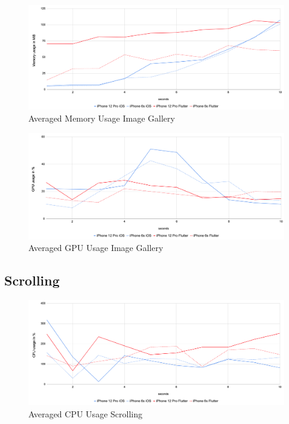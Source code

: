 \begin{figure}[!h]
    \centering
    \includegraphics[width=\linewidth]{images/performance_results/image_gallery/avg_memory_usage_image_gallery.png}
    \caption{Averaged Memory Usage Image Gallery}
    \label{fig:avg_memory_usage_image_gallery}
\end{figure}

\begin{figure}[!h]
    \centering
    \includegraphics[width=\linewidth]{images/performance_results/image_gallery/avg_gpu_usage_image_gallery.png}
    \caption{Averaged GPU Usage Image Gallery}
    \label{fig:avg_gpu_usage_detail_view}
\end{figure}


\subsection{Scrolling}

\begin{figure}[!h]
    \centering
    \includegraphics[width=\linewidth]{images/performance_results/image_gallery/avg_cpu_usage_image_gallery.png}
    \caption{Averaged CPU Usage Scrolling}
    \label{fig:avg_cpu_usage_scrolling}
\end{figure}

